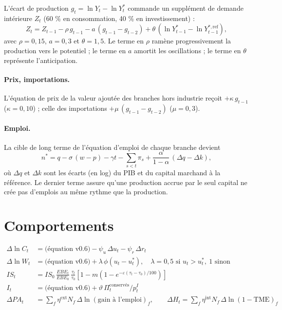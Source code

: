 L'écart de production $g_t = \ln Y_t - \ln Y^*_t$ commande un supplément de demande intérieure $Z_t$ (60 \% en
consommation, 40 \% en investissement) :
\begin{equation}
Z_t = Z_{t-1} - \rho\, g_{t-1} - a\,(g_{t-1}-g_{t-2}) + \theta\,(\ln Y^*_{t-1}-\ln Y^{*,\mathrm{ref}}_{t-1}),
\end{equation}
avec $\rho = 0{,}15$, $a = 0{,}3$ et $\theta = 1{,}5$. Le terme en $\rho$ ramène progressivement la production vers le
potentiel ; le terme en $a$ amortit les oscillations ; le terme en $\theta$ représente l'anticipation.

\paragraph{Prix, importations.} L'équation de prix de la valeur ajoutée des branches hors industrie reçoit
$+\kappa\,g_{t-1}$ ($\kappa = 0{,}10$) ; celle des importations $+\mu\,(g_{t-1}-g_{t-2})$ ($\mu = 0{,}3$).

\paragraph{Emploi.} La cible de long terme de l'équation d'emploi de chaque branche devient
\begin{equation}
n^* = q - \sigma\,(w-p) - \gamma t - \sum_{s<t}\pi_s + \frac{\alpha}{1-\alpha}\,(\Delta q - \Delta k),
\end{equation}
où $\Delta q$ et $\Delta k$ sont les écarts (en log) du PIB et du capital marchand à la référence. Le dernier terme
assure qu'une production accrue par le seul capital ne crée pas d'emplois au même rythme que la production.

\section{Comportements}

\begin{align}
\Delta \ln C_t &= \text{(équation v0.6)} - \psi_u\,\Delta u_t - \psi_r\,\Delta r_t\\
\Delta \ln W_t &= \text{(équation v0.6)} + \lambda\,\phi(u_t - u^*_t), \quad \lambda = 0{,}5 \text{ si } u_t>u^*_t,\ 1 \text{ sinon}\\
IS_t &= IS_0\,\frac{EBE_t}{EBE_0}\,\frac{\tau_t}{\tau_0}\left[1 - m\left(1-e^{-\varepsilon(\tau_t-\tau_0)/100}\right)\right]\\
I_t &= \text{(équation v0.6)} + \vartheta\,\Pi^{\mathrm{conservés}}_t/p^I_t\\
\Delta PA_t &= \sum_{f}\eta^{\mathrm{ext}} N_f\, \Delta\ln(\text{gain à l'emploi})_f,
\qquad \Delta H_t = \sum_f \eta^{\mathrm{int}} N_f\,\Delta \ln(1-\mathrm{TME})_f
\end{align}

